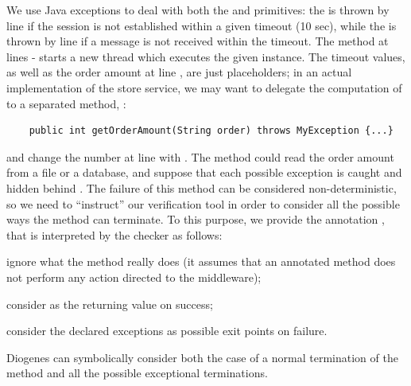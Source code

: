 We use Java exceptions to deal with both the  
and  primitives:
the  is thrown by line  
if the session 
is not established within a given timeout (10 sec), 
while the 
is thrown by line  if a message is not received within the timeout.
The  method at lines - starts a new 
thread which executes the given  instance.
%
The timeout values, as well as the order amount at line , are just placeholders;
in an actual implementation of the store service, 
we may want to delegate the computation of  
to a separated method, \eg:
\begin{mdframed}
  \begin{verbatim}
    public int getOrderAmount(String order) throws MyException {...}
  \end{verbatim}
\end{mdframed}
and change the number  at line  with .
The method could read the order amount from a file or a database,
and suppose that each possible exception
is caught and hidden behind . 
The failure of this method can be considered non-deterministic,
so we need to ``instruct'' our verification tool
in order to consider all the possible ways the method can terminate.
% 
To this purpose, we provide the annotation , that
is interpreted by the checker as follows:
\begin{inlinelist}[noitemsep,topsep=0pt]
\item ignore what the method really does (it assumes that an annotated 
    method does not perform any action directed to the middleware);
\item consider  as the returning value on success;
\item consider the declared exceptions as possible exit points on failure.
\end{inlinelist}
%
Diogenes can symbolically consider both the case of a normal 
termination of the method
and all the possible exceptional terminations.

